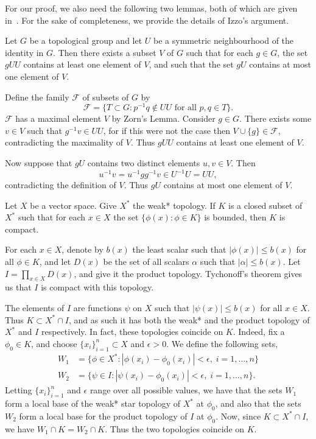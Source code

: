 For our proof, we also need the following two lemmas, both of which are
given in~\cite{izzo:haar}.  For the sake of completeness, we provide the
details of Izzo's argument.
\begin{lemma}\label{ginv:1}
Let $G$ be a topological group and let $U$ be a symmetric neighbourhood of 
the identity in $G$.  Then there exists a subset $V$ of $G$ such that for 
each $g \in G$, the set $gUU$ contains at least one element of 
$V$, and such that the set $gU$ contains at most one element of $V$.
\end{lemma}
\proof
Define the family ${\mathcal F}$ of subsets of $G$ by
\[
\mathcal{F} = \{ T \subset G: p^{-1}q \not\in UU\text{ for all }p,q\in T\}.
\]
${\mathcal F}$ has a maximal element $V$ by Zorn's Lemma.  Consider $g\in G$.
There exists some $v\in V$ such that $g^{-1}v\in UU$, for if this were not the case
then $V\cup\{g\} \in \mathcal{F}$, contradicting the maximality of $V$.  Thus
$gUU$ contains at least one element of $V$.

Now suppose that $gU$ contains two distinct elements $u,v\in V$.  Then
\[
u^{-1}v = u^{-1}gg^{-1}v \in U^{-1}U = UU,
\]
contradicting the definition
of $V$.  Thus $gU$ contains at most one element of $V$.
\done

\begin{lemma}\label{ginv:2}
Let $X$ be a vector space.
Give $X^*$ the weak* topology.  If $K$ is 
a closed subset of $X^*$ such that for each $x \in X$ the set 
$\{\phi(x):\phi\in K\}$ is bounded, then $K$ is compact.
\end{lemma}
\proof
For each $x\in X$, denote by $b(x)$ the least scalar such that $|\phi(x)| \leq b(x)$
for all $\phi\in K$, and let $D(x)$ be the set of all scalars $\alpha$ such that
$|\alpha| \leq b(x)$.  Let $I = \prod_{x\in X}D(x)$, and give it the product topology.
Tychonoff's theorem gives us that $I$ is compact with this topology.

The elements of $I$ are functions $\psi$
on $X$ such that $| \psi(x)| \leq b(x)$ for all $x\in X$.  Thus
$K\subset X^* \cap I$, and as such it has both the weak* and the product
topology of $X^*$ and $I$ respectively.  In fact, these topologies coincide on $K$.
Indeed, fix a $\phi_0 \in K$, and choose $\{x_i\}_{i=1}^n \subset X$ and $\epsilon > 0$.
We define the following sets,
\begin{align*}
W_1 &= \{\phi\in X^* : |\phi(x_i) - \phi_0(x_i)| < \epsilon,\;i=1,\dots,n\} \\
W_2 &= \{\psi\in I : |\psi(x_i) - \phi_0(x_i)| < \epsilon,\;i=1,\dots,n\}.
\end{align*}
Letting $\{x_i\}_{i=1}^n$ and $\epsilon$ range over all possible values, we have
that the sets $W_1$ form a local base of the weak* star topology of $X^*$ at $\phi_0$,
and also that the sets $W_2$ form a local base for the product topology of $I$
at $\phi_0$.  Now, since $K\subset X^*\cap I$, we have $W_1\cap K = W_2\cap K$.
Thus the two topologies coincide on $K$.

